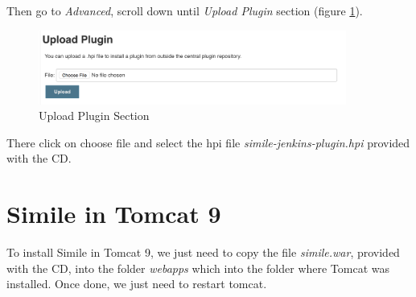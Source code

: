 Then go to \textit{Advanced}, scroll down until \textit{Upload Plugin} section (figure \ref{fig:jenkins-plugin-03}).

\begin{figure}[H]
	\centering
    \includegraphics[width=0.9\textwidth]{grafiken/jenkins-plugin-03}
    \caption{Upload Plugin Section}
    \label{fig:jenkins-plugin-03}
\end{figure}

There click on choose file and select the hpi file \emph{simile-jenkins-plugin.hpi} provided with the CD.

\section{Simile in Tomcat 9}
To install Simile in Tomcat 9, we just need to copy the file \emph{simile.war}, provided with the CD, into the folder \emph{webapps} which into the folder where Tomcat was installed. Once done, we just need to restart tomcat.